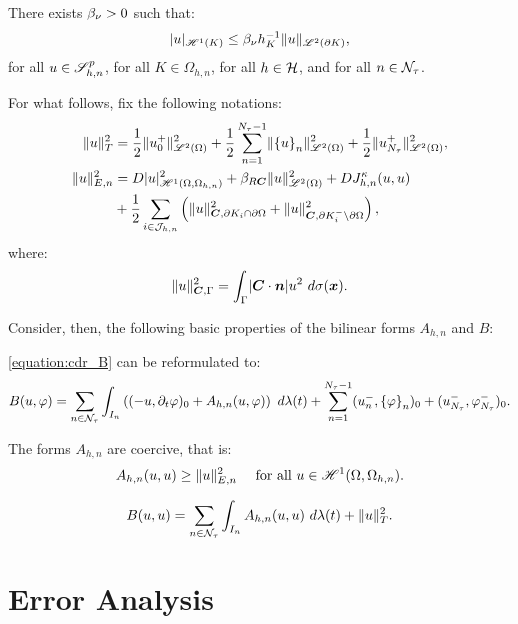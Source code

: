 \begin{lemma}
    There exists $\beta_{\nu} > 0$ such that:
    \begin{gather}
        \lvert u \rvert_{\mathscr{H}^{1}(K)} \leq \beta_{\nu} h_K^{-1} \lVert u \rVert_{\mathscr{L}^{2}(\partial K)},
    \end{gather}
    for all $u \in \mathscr{S}^p_{h, n}$, for all $K \in \Omega_{h, n}$, for all $h \in \mathcal{H}$, and for all $n \in \mathcal{N}_{\tau}$.
\end{lemma}

For what follows, fix the following notations:
\begin{align} %
    \lVert u \rVert_{T}^2 &= \frac{1}{2} \lVert u_0^+ \rVert_{\SpaceLp{2}(\Omega)}^2 + \frac{1}{2} \sum_{n = 1}^{\nTimeIndices - 1} \lVert \left\{ u \right\}_n \rVert_{\SpaceLp{2}(\Omega)}^2 + \frac{1}{2} \lVert u_{\nTimeIndices}^+ \rVert_{\SpaceLp{2}(\Omega)}^2, \\
    \lVert u \rVert_{E, n}^2 &= \Diffusion \lvert u \rvert_{\SpaceHk{1}(\Omega, \Omega_{h, n})}^2 + \BoundC{\Reaction \Convection} \lVert u \rVert_{\SpaceLp{2}(\Omega)}^2 + \Diffusion J^{\kappa}_{h, n}(u, u) \\
    &+ \frac{1}{2} \sum_{i \in \SpaceTimeIndices} \left( \lVert u \rVert_{\Convection, \partial K_i \cap \partial \Omega}^2 + \lVert u \rVert_{\Convection, \partial K_i^- \setminus \partial \Omega}^2 \right),
\end{align}
where:
\begin{gather}
    \lVert u \rVert_{\bm{C}, \Gamma}^2 = \int_{\Gamma} \lvert \bm{C} \cdot \bm{n} \rvert u^2 ~ d \sigma(\bm{x}).
\end{gather}

Consider, then, the following basic properties of the bilinear forms $A_{h, n}$ and $B$:

\begin{lemma}[Reformulation of $B$]
    \eqref{equation:cdr_B} can be reformulated to:
    \begin{gather}
        B(u, \varphi) = \sum_{n \in \mathcal{N}_{\tau}} \int_{I_n} \left( (-u, \partial_t \varphi )_0 + A_{h, n}(u, \varphi) \right) ~ d \lambda(t) + \sum_{n = 1}^{N_{\tau} - 1} (u_n^-, \left\{ \varphi \right\}_n )_0 + (u_{N_{\tau}}^-, \varphi_{N_{\tau}}^-)_0. \label{equation:cdr_B_reformulated}
    \end{gather}
\end{lemma}

\begin{lemma}[Coercivity of $A_{h, n}$]
    The forms $A_{h, n}$ are coercive, that is:
    \begin{gather}
        A_{h, n}(u, u) \geq \lVert u \rVert_{E, n}^2 \quad \text{ for all } u \in \mathscr{H}^{1}(\Omega, \Omega_{h, n}).
    \end{gather}
\end{lemma}

\begin{lemma}[Coercivity of $B$]
    \begin{gather}
        B(u, u) = \sum_{n \in \mathcal{N}_{\tau}} \int_{I_n} A_{h, n}(u, u) ~ d \lambda(t) + \lVert u \rVert_{T}^2.
    \end{gather}
\end{lemma}

\newpage
\section{Error Analysis}